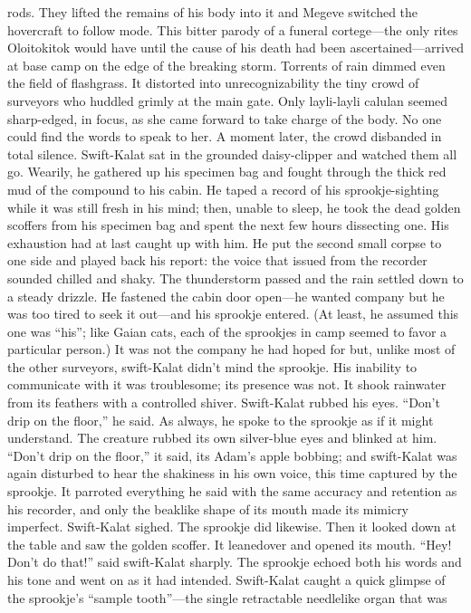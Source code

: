 \documentclass[9pt]{article}
\begin{document}
rods. They lifted the remains of his body into it and Megeve switched the hovercraft to follow mode.
This bitter parody of a funeral cortege—the only rites Oloitokitok would have until the cause of his death
had been ascertained—arrived at base camp on the edge of the breaking storm.
Torrents of rain dimmed even the field of flashgrass. It distorted into unrecognizability the tiny crowd
of surveyors who huddled grimly at the main gate. Only layli-layli calulan seemed sharp-edged, in
focus, as she came forward to take charge of the body.
No one could find the words to speak to her. A moment later, the crowd disbanded in total silence.
Swift-Kalat sat in the grounded daisy-clipper and watched them all go.
Wearily, he gathered up his specimen bag and fought through the thick red mud of the compound to
his cabin.
He taped a record of his sprookje-sighting while it was still fresh in his mind; then, unable to sleep, he
took the dead golden scoffers from his specimen bag and spent the next few hours dissecting one. His
exhaustion had at last caught up with him. He put the second small corpse to one side and played back
his report: the voice that issued from the recorder sounded chilled and shaky.
The thunderstorm passed and the rain settled down to a steady drizzle. He fastened the cabin door
open—he wanted company but he was too tired to seek it out—and his sprookje entered. (At least, he
assumed this one was “his”; like Gaian cats, each of the sprookjes in camp seemed to favor a particular
person.) It was not the company he had hoped for but, unlike most of the other surveyors, swift-Kalat
didn’t mind the sprookje. His inability to communicate with it was troublesome; its presence was not.
It shook rainwater from its feathers with a controlled shiver.
Swift-Kalat rubbed his eyes. “Don’t drip on the floor,” he said. As always, he spoke to the sprookje
as if it might understand.
The creature rubbed its own silver-blue eyes and blinked at him. “Don’t drip on the floor,” it said, its
Adam’s apple bobbing; and swift-Kalat was again disturbed to hear the shakiness in his own voice, this
time captured by the sprookje.
It parroted everything he said with the same accuracy and retention as his recorder, and only the
beaklike shape of its mouth made its mimicry imperfect.
Swift-Kalat sighed.
The sprookje did likewise. Then it looked down at the table and saw the golden scoffer. It leanedover and opened its mouth.
“Hey! Don’t do that!” said swift-Kalat sharply.
The sprookje echoed both his words and his tone and went on as it had intended. Swift-Kalat caught
a quick glimpse of the sprookje’s “sample tooth”—the single retractable needlelike organ that was
\end{document}

